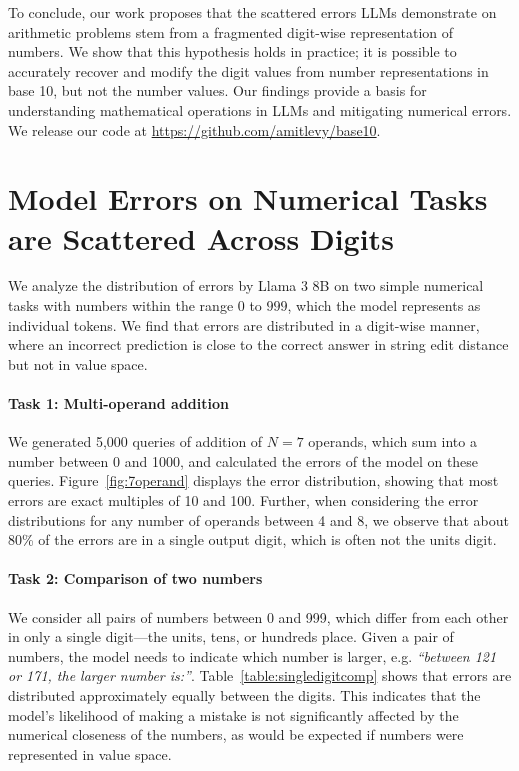 \documentclass[11pt]{article}
\begin{document}
To conclude, our work proposes that the scattered errors LLMs demonstrate on arithmetic problems stem from a fragmented digit-wise representation of numbers. We show that this hypothesis holds in practice; it is possible to accurately recover and modify the digit values from number representations in base 10, but not the number values. Our findings provide a basis for understanding mathematical operations in LLMs and mitigating numerical errors. We release our code at \url{https://github.com/amitlevy/base10}.


\section{Model Errors on Numerical Tasks are Scattered Across Digits}
\label{sec:error_distribution}

We analyze the distribution of errors by Llama 3 8B on two simple numerical tasks with numbers within the range $0$ to $999$, which the model represents as individual tokens. We find that errors are distributed in a digit-wise manner, where an incorrect prediction is close to the correct answer in string edit distance but not in value space. 

\paragraph{Task 1: Multi-operand addition} 
We generated 5,000 queries of addition of $N=7$ operands, which sum into a number between 0 and 1000, and calculated the errors of the model on these queries.
Figure~\ref{fig:7operand} displays the error distribution, showing that most errors are exact multiples of 10 and 100. 
Further, when considering the error distributions for any number of operands between 4 and 8, we observe that about 80\% of the errors are in a single output digit, which is often not the units digit.
 

\paragraph{Task 2: Comparison of two numbers} 
We consider all pairs of numbers between 0 and 999, which differ from each other in only a single digit—the units, tens, or hundreds place. Given a pair of numbers, the model needs to indicate which number is larger, e.g. \textit{``between 121 or 171, the larger number is:''}.
Table~\ref{table:singledigitcomp} shows that errors are distributed approximately equally between the digits. This indicates that the model's likelihood of making a mistake is not significantly affected by the numerical closeness of the numbers, as would be expected if numbers were represented in value space.
\end{document}
